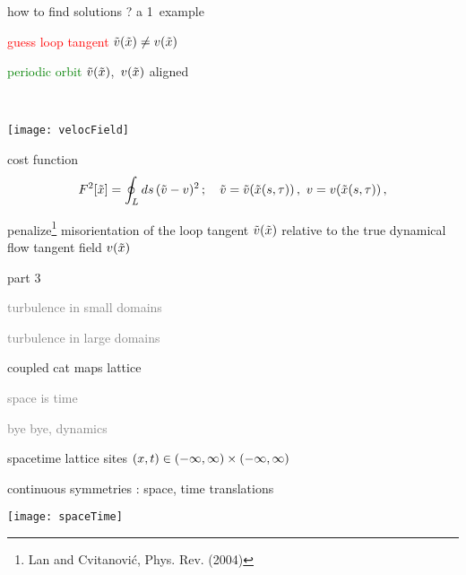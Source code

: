 \begin{frame}{how to find solutions ? a 1\dmn\ example}
\begin{center}
\begin{minipage}[c]{0.55\textwidth}
\textcolor{red}{guess loop tangent}
$\tilde{v}(\tilde{x})
	\neq
v(\tilde{x})$

	\vskip 0.5cm

\textcolor{green}{periodic orbit}
$\tilde{v}(\tilde{x})$,~$v(\tilde{x})$
aligned
\end{minipage}%
~~~~~~~\begin{minipage}[c]{0.40\textwidth}
	\begin{center}
	\texttt{[image: velocField]}
	\end{center}
\end{minipage}
\end{center}
\begin{block}{cost function}%
\[
F^2[\tilde{x}] =
            \oint_L ds\,(\tilde{v}-v)^2
    \,;\quad
    \tilde{v} = \tilde{v}(\tilde{x}(s,\tau))\,,\,\,
    v = v(\tilde{x}(s,\tau))
\,,
\]
\end{block}
\bigskip

penalize\footnote{ Lan and Cvitanovi\'c, Phys. Rev. (2004)}
 misorientation of the loop tangent
$\tilde{v}(\tilde{x})$
relative to the true dynamical flow tangent field $v(\tilde{x})$
\end{frame}


\begin{frame}{part 3}
\begin{enumerate}
              \item
    \textcolor{gray}{\small
turbulence in small domains
              \item
turbulence in large domains
        }
              \item
    {\Large
coupled cat maps lattice
    }\textcolor{gray}{\small
              \item
space is time
              \item
bye bye, dynamics
                    }
            \end{enumerate}
\end{frame}

\begin{frame}{
spacetime lattice sites $(x,t) \in (-\infty, \infty)\times (-\infty, \infty)$
             }

\bigskip

continuous symmetries : space, time translations
\medskip

\begin{center}
\texttt{[image: spaceTime]}
\end{center}
\end{frame}

